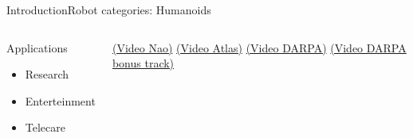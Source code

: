 \documentclass[10pt,compress]{beamer} %
\begin{document}
\begin{frame}{Introduction}{Robot categories: Humanoids}
   \begin{columns}
	   \begin{block}{Applications}
	   \begin{itemize}
	   \item Research
	   \item Enterteinment
	   \item Telecare
	   \end{itemize}
	   \end{block}

	   \href{https://www.youtube.com/watch?v=qsRsrMQy64k}{(Video Nao)}
	   \href{https://www.youtube.com/watch?v=M7nLQpWiy1o}{(Video Atlas)}
	   \href{https://www.youtube.com/watch?v=BGOUSvaQcBs}{(Video DARPA)}
	   \href{https://www.youtube.com/watch?v=7A_QPGcjrh0}{(Video DARPA bonus track)}


\end{columns}
\end{frame}
\end{document}

